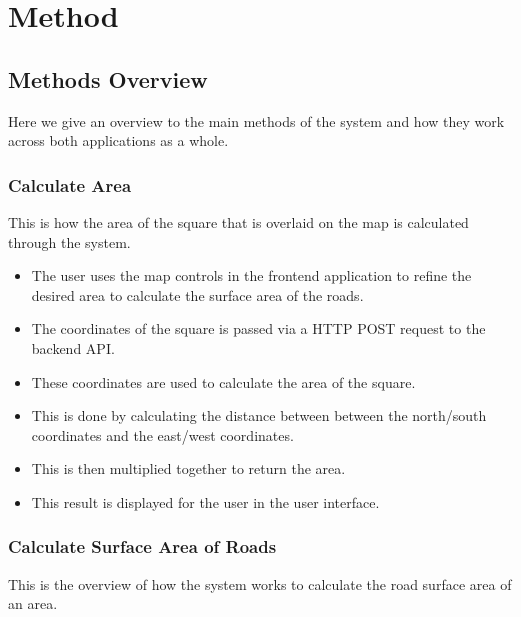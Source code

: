 \documentclass[a4paper,11pt]{article}
\begin{document}
\section{Method}


\subsection{Methods Overview}

Here we give an overview to the main methods of the system and how they work
across both applications as a whole.

\subsubsection{Calculate Area}

This is how the area of the square that is overlaid on the map is calculated
through the system.

\begin{itemize}
  \item The user uses the map controls in the frontend application to refine
    the desired area to calculate the surface area of the roads.
  \item The coordinates of the square is passed via a HTTP POST request to
    the backend API.\@
  \item These coordinates are used to calculate the area of the square.
  \item This is done by calculating the distance between between the
    north/south coordinates and the east/west coordinates.
  \item This is then multiplied together to return the area.
  \item This result is displayed for the user in the user interface.
\end{itemize}

\subsubsection{Calculate Surface Area of Roads}

This is the overview of how the system works to calculate the road surface area
of an area.
\end{document}
